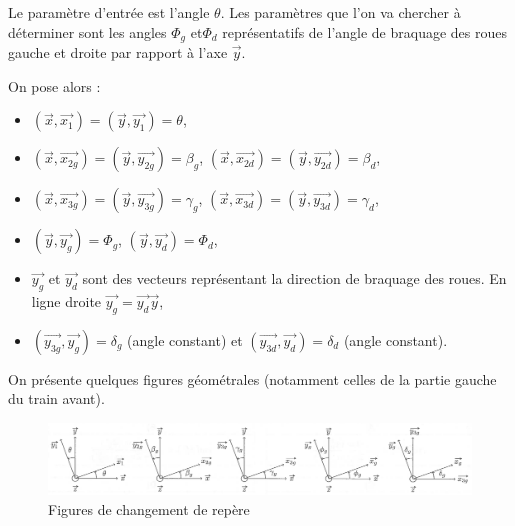 Le paramètre d'entrée est l'angle $\theta$. Les paramètres que l'on va chercher à déterminer sont les angles $\Phi_g$ et$\Phi_d$ représentatifs de l'angle de braquage des roues gauche et droite par rapport à l'axe $\overrightarrow{y}$.

On pose alors :
\begin{itemize}
 \item $(\overrightarrow{x},\overrightarrow{x_1})=(\overrightarrow{y},\overrightarrow{y_1})=\theta$,
 \item $(\overrightarrow{x},\overrightarrow{x_{2g}})=(\overrightarrow{y},\overrightarrow{y_{2g}})=\beta_g$, $(\overrightarrow{x},\overrightarrow{x_{2d}})=(\overrightarrow{y},\overrightarrow{y_{2d}})=\beta_d$,
 \item $(\overrightarrow{x},\overrightarrow{x_{3g}})=(\overrightarrow{y},\overrightarrow{y_{3g}})=\gamma_g$, $(\overrightarrow{x},\overrightarrow{x_{3d}})=(\overrightarrow{y},\overrightarrow{y_{3d}})=\gamma_d$,
 \item $(\overrightarrow{y},\overrightarrow{y_g})=\Phi_g$, $(\overrightarrow{y},\overrightarrow{y_{d}})=\Phi_d$,
 \item $\overrightarrow{y_g}$ et $\overrightarrow{y_d}$ sont des vecteurs représentant la direction de braquage des roues. En ligne droite $\overrightarrow{y_g}=\overrightarrow{y_d}\overrightarrow{y}$,
 \item $(\overrightarrow{y_{3g}},\overrightarrow{y_g})=\delta_g$ (angle constant) et $(\overrightarrow{y_{3d}},\overrightarrow{y_d})=\delta_d$ (angle constant).
\end{itemize}

On présente quelques figures géométrales (notamment celles de la partie gauche du train avant).

\begin{figure}[ht!]
\begin{center}
 \includegraphics[width=0.9\linewidth]{img/fig13}
\end{center}
\caption{Figures de changement de repère}
\label{fig12}
\end{figure}

